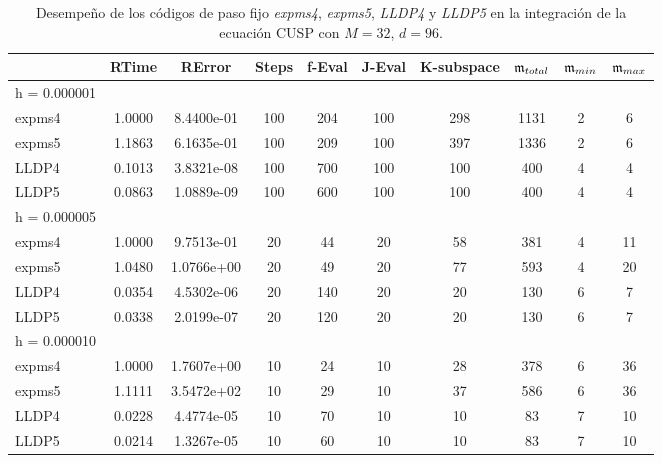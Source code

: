 \begin{table}[htb]
	\caption{Desempeño de los códigos de paso fijo \emph{expms4}, \emph{expms5}, \emph{LLDP4} y \emph{LLDP5} en la integración de la ecuación CUSP con $M=32$, $d=96$.}
	\centering
	\begin{adjustbox}{width=0.95\columnwidth,center}
		\begin{tabular}{lccccccccc}
			\hline
			& RTime & RError & Steps & f-Eval & J-Eval & K-subspace & $\mathfrak{m}_{total}$ & $\mathfrak{m}_{min}$ & $\mathfrak{m}_{max}$ \\
			\hline
			h = 0.000001 &  &  &  &  &  &  &  &  &  \\
			expms4 & 1.0000 & 8.4400e-01 & 100 & 204 & 100 & 298 & 1131 & 2 & 6  \\
			expms5 & 1.1863 & 6.1635e-01 & 100 & 209 & 100 & 397 & 1336 & 2 & 6  \\
			LLDP4 & 0.1013 & 3.8321e-08 & 100 & 700 & 100 & 100 & 400 & 4 & 4  \\
			LLDP5 & 0.0863 & 1.0889e-09 & 100 & 600 & 100 & 100 & 400 & 4 & 4  \\
			\hline
			h = 0.000005 &  &  &  &  &  &  &  &  &  \\
			expms4 & 1.0000 & 9.7513e-01 & 20 & 44 & 20 & 58 & 381 & 4 & 11  \\
			expms5 & 1.0480 & 1.0766e+00 & 20 & 49 & 20 & 77 & 593 & 4 & 20  \\
			LLDP4 & 0.0354 & 4.5302e-06 & 20 & 140 & 20 & 20 & 130 & 6 & 7  \\
			LLDP5 & 0.0338 & 2.0199e-07 & 20 & 120 & 20 & 20 & 130 & 6 & 7  \\
			\hline
			h = 0.000010 &  &  &  &  &  &  &  &  &  \\
			expms4 & 1.0000 & 1.7607e+00 & 10 & 24 & 10 & 28 & 378 & 6 & 36  \\
			expms5 & 1.1111 & 3.5472e+02 & 10 & 29 & 10 & 37 & 586 & 6 & 36  \\
			LLDP4 & 0.0228 & 4.4774e-05 & 10 & 70 & 10 & 10 & 83 & 7 & 10  \\
			LLDP5 & 0.0214 & 1.3267e-05 & 10 & 60 & 10 & 10 & 83 & 7 & 10  \\
			\hline
		\end{tabular}
	\end{adjustbox}
	\label{tab:num-exp-lldp-fix-step:cpna}
\end{table}

\vspace{0.3cm}

